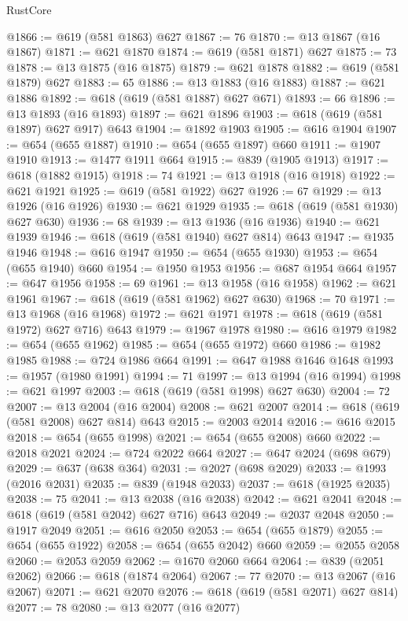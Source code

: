 \begin{lexlean}{RustCore}
\begin{coremodule}
@1866 := @619 (@581 @1863) @627
@1867 := 76
@1870 := @13 @1867 (@16 @1867)
@1871 := @621 @1870
@1874 := @619 (@581 @1871) @627
@1875 := 73
@1878 := @13 @1875 (@16 @1875)
@1879 := @621 @1878
@1882 := @619 (@581 @1879) @627
@1883 := 65
@1886 := @13 @1883 (@16 @1883)
@1887 := @621 @1886
@1892 := @618 (@619 (@581 @1887) @627 @671)
@1893 := 66
@1896 := @13 @1893 (@16 @1893)
@1897 := @621 @1896
@1903 := @618 (@619 (@581 @1897) @627 @917) @643
@1904 := @1892 @1903
@1905 := @616 @1904
@1907 := @654 (@655 @1887)
@1910 := @654 (@655 @1897) @660
@1911 := @1907 @1910
@1913 := @1477 @1911 @664
@1915 := @839 (@1905 @1913)
@1917 := @618 (@1882 @1915)
@1918 := 74
@1921 := @13 @1918 (@16 @1918)
@1922 := @621 @1921
@1925 := @619 (@581 @1922) @627
@1926 := 67
@1929 := @13 @1926 (@16 @1926)
@1930 := @621 @1929
@1935 := @618 (@619 (@581 @1930) @627 @630)
@1936 := 68
@1939 := @13 @1936 (@16 @1936)
@1940 := @621 @1939
@1946 := @618 (@619 (@581 @1940) @627 @814) @643
@1947 := @1935 @1946
@1948 := @616 @1947
@1950 := @654 (@655 @1930)
@1953 := @654 (@655 @1940) @660
@1954 := @1950 @1953
@1956 := @687 @1954 @664
@1957 := @647 @1956
@1958 := 69
@1961 := @13 @1958 (@16 @1958)
@1962 := @621 @1961
@1967 := @618 (@619 (@581 @1962) @627 @630)
@1968 := 70
@1971 := @13 @1968 (@16 @1968)
@1972 := @621 @1971
@1978 := @618 (@619 (@581 @1972) @627 @716) @643
@1979 := @1967 @1978
@1980 := @616 @1979
@1982 := @654 (@655 @1962)
@1985 := @654 (@655 @1972) @660
@1986 := @1982 @1985
@1988 := @724 @1986 @664
@1991 := @647 @1988 @1646 @1648
@1993 := @1957 (@1980 @1991)
@1994 := 71
@1997 := @13 @1994 (@16 @1994)
@1998 := @621 @1997
@2003 := @618 (@619 (@581 @1998) @627 @630)
@2004 := 72
@2007 := @13 @2004 (@16 @2004)
@2008 := @621 @2007
@2014 := @618 (@619 (@581 @2008) @627 @814) @643
@2015 := @2003 @2014
@2016 := @616 @2015
@2018 := @654 (@655 @1998)
@2021 := @654 (@655 @2008) @660
@2022 := @2018 @2021
@2024 := @724 @2022 @664
@2027 := @647 @2024 (@698 @679)
@2029 := @637 (@638 @364)
@2031 := @2027 (@698 @2029)
@2033 := @1993 (@2016 @2031)
@2035 := @839 (@1948 @2033)
@2037 := @618 (@1925 @2035)
@2038 := 75
@2041 := @13 @2038 (@16 @2038)
@2042 := @621 @2041
@2048 := @618 (@619 (@581 @2042) @627 @716) @643
@2049 := @2037 @2048
@2050 := @1917 @2049
@2051 := @616 @2050
@2053 := @654 (@655 @1879)
@2055 := @654 (@655 @1922)
@2058 := @654 (@655 @2042) @660
@2059 := @2055 @2058
@2060 := @2053 @2059
@2062 := @1670 @2060 @664
@2064 := @839 (@2051 @2062)
@2066 := @618 (@1874 @2064)
@2067 := 77
@2070 := @13 @2067 (@16 @2067)
@2071 := @621 @2070
@2076 := @618 (@619 (@581 @2071) @627 @814)
@2077 := 78
@2080 := @13 @2077 (@16 @2077)

\end{coremodule}
\end{lexlean}
